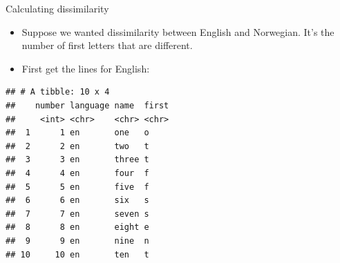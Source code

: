\documentclass[
  ignorenonframetext,
]{beamer}
\newenvironment{Shaded}{\begin{snugshade}}{\end{snugshade}}
\newcommand{\KeywordTok}[1]{\textcolor[rgb]{0.13,0.29,0.53}{\textbf{#1}}}
\newcommand{\NormalTok}[1]{#1}
\newcommand{\OperatorTok}[1]{\textcolor[rgb]{0.81,0.36,0.00}{\textbf{#1}}}
\newcommand{\StringTok}[1]{\textcolor[rgb]{0.31,0.60,0.02}{#1}}
\begin{document}
\begin{frame}[fragile]{Calculating dissimilarity}
\protect\hypertarget{calculating-dissimilarity}{}

\begin{itemize}
\item
  Suppose we wanted dissimilarity between English and Norwegian. It's
  the number of first letters that are different.
\item
  First get the lines for English:
\end{itemize}

\scriptsize

\begin{Shaded}
\end{Shaded}

\begin{verbatim}
## # A tibble: 10 x 4
##    number language name  first
##     <int> <chr>    <chr> <chr>
##  1      1 en       one   o    
##  2      2 en       two   t    
##  3      3 en       three t    
##  4      4 en       four  f    
##  5      5 en       five  f    
##  6      6 en       six   s    
##  7      7 en       seven s    
##  8      8 en       eight e    
##  9      9 en       nine  n    
## 10     10 en       ten   t
\end{verbatim}

\normalsize

\end{frame}
\end{document}
